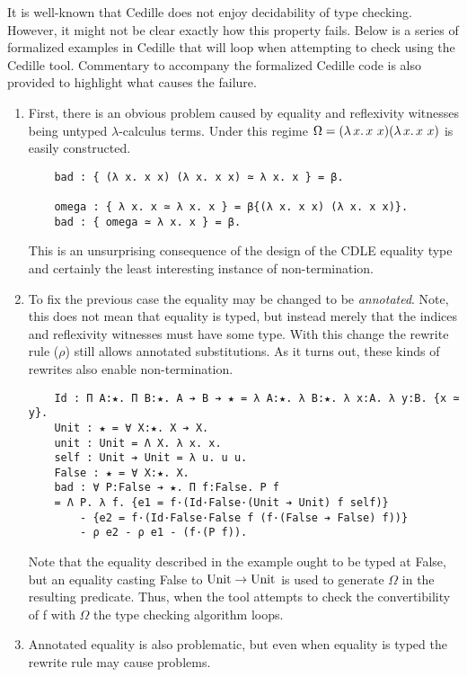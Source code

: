 It is well-known that Cedille does not enjoy decidability of type checking.
However, it might not be clear exactly how this property fails.
Below is a series of formalized examples in Cedille that will loop when attempting to check using the Cedille tool.
Commentary to accompany the formalized Cedille code is also provided to highlight what causes the failure.
\begin{enumerate}
    \item {
        First, there is an obvious problem caused by equality and reflexivity witnesses being untyped $\lambda$-calculus terms.
        Under this regime $\Omega = ({\lambda}\, x.\, x\ x) ({\lambda}\, x.\, x\ x)$ is easily constructed.
\begin{verbatim}
    bad : { (λ x. x x) (λ x. x x) ≃ λ x. x } = β.

    omega : { λ x. x ≃ λ x. x } = β{(λ x. x x) (λ x. x x)}.
    bad : { omega ≃ λ x. x } = β.
\end{verbatim}
        This is an unsurprising consequence of the design of the CDLE equality type and certainly the least interesting instance of non-termination.
    }
    \item {
        To fix the previous case the equality may be changed to be \textit{annotated}.
        Note, this does not mean that equality is typed, but instead merely that the indices and reflexivity witnesses must have some type.
        With this change the rewrite rule ($\rho$) still allows annotated substitutions.
        As it turns out, these kinds of rewrites also enable non-termination.
\begin{verbatim}
    Id : Π A:★. Π B:★. A ➔ B ➔ ★ = λ A:★. λ B:★. λ x:A. λ y:B. {x ≃ y}.
    Unit : ★ = ∀ X:★. X ➔ X.
    unit : Unit = Λ X. λ x. x.
    self : Unit ➔ Unit = λ u. u u.
    False : ★ = ∀ X:★. X.
    bad : ∀ P:False ➔ ★. Π f:False. P f
    = Λ P. λ f. {e1 = f·(Id·False·(Unit ➔ Unit) f self)}
        - {e2 = f·(Id·False·False f (f·(False ➔ False) f))}
        - ρ e2 - ρ e1 - (f·(P f)).
\end{verbatim}
        Note that the equality described in the example ought to be typed at False, but an equality casting False to $\textnormal{Unit} \to \textnormal{Unit}$ is used to generate $\Omega$ in the resulting predicate.
        Thus, when the tool attempts to check the convertibility of f with $\Omega$ the type checking algorithm loops.
    }
    \item {
        Annotated equality is also problematic, but even when equality is typed the rewrite rule may cause problems.
}
\end{enumerate}
